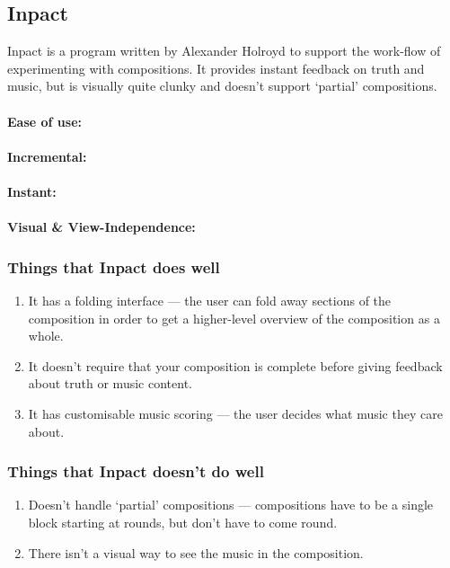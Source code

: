 \documentclass[12pt]{article}
\begin{document}
\subsection{Inpact}

Inpact is a program written by Alexander Holroyd to support the work-flow of experimenting with
compositions.  It provides instant feedback on truth and music, but is visually quite clunky and
doesn't support `partial' compositions.

\paragraph{Ease of use:}

\paragraph{Incremental:}

\paragraph{Instant:}

\paragraph{Visual \& View-Independence:}

\subsubsection{Things that Inpact does well}

\begin{enumerate}
    \item It has a folding interface --- the user can fold away sections of the composition in order
        to get a higher-level overview of the composition as a whole.
    \item It doesn't require that your composition is complete before giving feedback about truth or
        music content.
    \item It has customisable music scoring --- the user decides what music they care about.
\end{enumerate}

\subsubsection{Things that Inpact doesn't do well}

\begin{enumerate}
    \item Doesn't handle `partial' compositions --- compositions have to be a single block starting
        at rounds, but don't have to come round.
    \item There isn't a visual way to see the music in the composition.
\end{enumerate}
\end{document}
